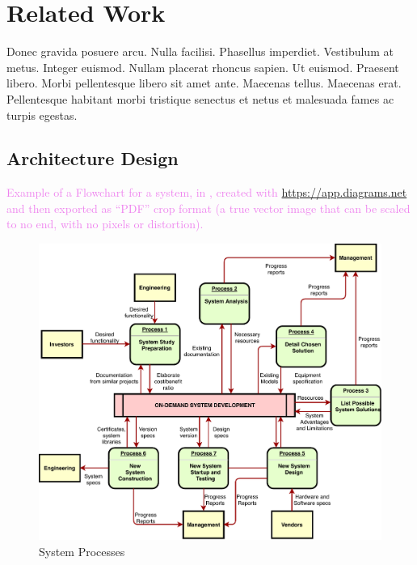 \chapter{Related Work}
\chaptoc
\label{chap:architecture}

Donec gravida posuere arcu. Nulla facilisi. Phasellus imperdiet. Vestibulum at metus. Integer euismod. Nullam placerat rhoncus sapien. Ut euismod. Praesent libero. Morbi pellentesque libero sit amet ante. Maecenas tellus. Maecenas erat. Pellentesque habitant morbi tristique senectus et netus et malesuada fames ac turpis egestas.
\section{Architecture Design} 
\textcolor{violet}{Example of a Flowchart for a system, in , created with \url{https://app.diagrams.net} and then exported as ``PDF'' crop format (a true vector image that can be scaled to no end, with no pixels or distortion).}

\begin{figure}[h]
\centering
\includegraphics[width=1.0\textwidth]{./Images/Flowchart_from_draw-io.pdf}
\caption{System Processes}
\label{fig:flowchart}
\end{figure}

